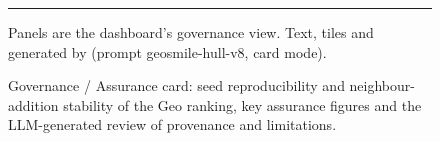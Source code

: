 \begin{figure}[!htbp]
\begin{tcolorbox}
\noindent\cardTileA\hfill\cardTileB\hfill\cardTileC\hfill\cardTileD\par\vspace{4pt}
{\color{cardRule}\rule{\linewidth}{0.4pt}}\par\vspace{1pt}
{\color{cardMuted}\footnotesize \cardFooter{} Panels are the dashboard's governance view. Text,
tiles and  generated by \cardModel{} (prompt geosmile-hull-v8, card mode).\par}
\end{tcolorbox}
\caption{Governance / Assurance card: seed reproducibility and neighbour-addition stability of
the Geo ranking, key assurance figures and the LLM-generated review of provenance and
limitations.}
\label{fig:stakeholder-governance}
\end{figure}
